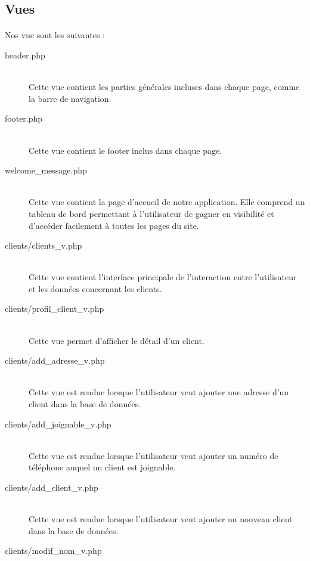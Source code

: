     \subsection{Vues}
    \paragraph{}
        Nos vue sont les suivantes :
        \begin{description}
            \item[header.php]\hfill \\
                Cette vue contient les parties générales incluses dans chaque
                page, comme la barre de navigation.
            \item[footer.php]\hfill \\
                Cette vue contient le footer inclus dans chaque page.
            \item[welcome\_message.php]\hfill \\
                Cette vue contient la page d'accueil de notre application.
                Elle comprend un tableau de bord permettant à l'utilisateur
                de gagner en visibilité et d'accéder facilement à toutes les
                pages du site.
            \item[clients/clients\_v.php]\hfill \\
                Cette vue contient l'interface principale de l'interaction
                entre l'utilisateur et les données concernant les clients.
            \item[clients/profil\_client\_v.php]\hfill \\
                Cette vue permet d'afficher le détail d'un client.
            \item[clients/add\_adresse\_v.php]\hfill \\
                Cette vue est rendue lorsque l'utilisateur veut ajouter une
                adresse d'un client dans la base de données.
            \item[clients/add\_joignable\_v.php]\hfill \\
                Cette vue est rendue lorsque l'utilisateur veut ajouter un
                numéro de téléphone auquel un client est joignable.
            \item[clients/add\_client\_v.php]\hfill \\
                Cette vue est rendue lorsque l'utilisateur veut ajouter un
                nouveau client dans la base de données.
            \item[clients/modif\_nom\_v.php]\hfill \\

\end{description}
